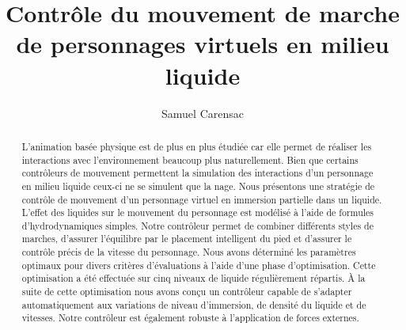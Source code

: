 \documentclass[runningheads,a4paper]{llncs}
\begin{document}
\mainmatter  %

\title{Contrôle du mouvement de marche\\ de personnages virtuels en milieu liquide}


%
%
\author{Samuel Carensac}
%


%
%

\maketitle



\begin{abstract}
 L'animation basée physique est de plus en plus étudiée car elle permet de réaliser les interactions avec l'environnement beaucoup plus naturellement. Bien que certains contrôleurs de mouvement permettent la simulation des interactions d'un personnage en milieu liquide ceux-ci ne se simulent que la nage. Nous présentons une stratégie de contrôle de mouvement d'un personnage virtuel en immersion partielle dans un liquide. L'effet des liquides sur le mouvement du personnage est modélisé à l'aide de formules d'hydrodynamiques simples. Notre contrôleur permet de combiner différents styles de marches, d'assurer l'équilibre par le placement intelligent du pied et d'assurer le contrôle précis de la vitesse du personnage. Nous avons déterminé les paramètres optimaux pour divers critères d'évaluations à l'aide d'une phase d'optimisation. Cette optimisation a été effectuée sur cinq niveaux de liquide régulièrement répartis.
\`A la suite de cette optimisation nous avons conçu un contrôleur capable de s'adapter automatiquement aux variations de niveau d'immersion, de densité du liquide et de vitesses. Notre contrôleur est également robuste à l'application de forces externes.
\end{abstract}
\end{document}
